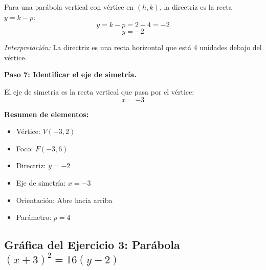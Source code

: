 \documentclass[12pt,a4paper]{article}
\begin{document}
	Para una parábola vertical con vértice en \((h,k)\), la directriz es la recta \(y=k-p\):
	\[
	y=k-p=2-4=-2
	\]
	\[
	\boxed{y=-2}
	\]

	\emph{Interpretación:} La directriz es una recta horizontal que está 4 unidades debajo del vértice.

	\bigskip

	\textbf{Paso 7: Identificar el eje de simetría.}

	El eje de simetría es la recta vertical que pasa por el vértice:
	\[
	x=-3
	\]

	\bigskip

	\textbf{Resumen de elementos:}
	\begin{itemize}
		\item Vértice: \(V(-3,2)\)
		\item Foco: \(F(-3,6)\)
		\item Directriz: \(y=-2\)
		\item Eje de simetría: \(x=-3\)
		\item Orientación: Abre hacia arriba
		\item Parámetro: \(p=4\)
	\end{itemize}

	\subsection*{Gráfica del Ejercicio 3: Parábola \((x+3)^2=16(y-2)\)}
\end{document}
